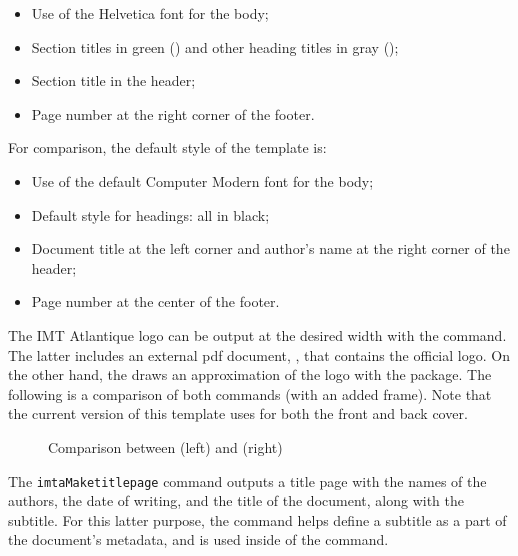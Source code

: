 \documentclass{report}
\begin{document}
\begin{itemize}
    \item Use of the Helvetica font for the body;
    \item Section titles in green () and other heading titles in gray ();
    \item Section title in the header;
    \item Page number at the right corner of the footer.
\end{itemize}

\vspace{1em}
For comparison, the default style of the template is:

\begin{itemize}
    \item Use of the default Computer Modern font for the body;
    \item Default style for headings: all in black;
    \item Document title at the left corner and author's name at the right corner of the header;
    \item Page number at the center of the footer.
\end{itemize}


The IMT Atlantique logo can be output at the desired width with the  command.
The latter includes an external pdf document, , that contains the official logo.
On the other hand, the  draws an approximation of the logo with the  package.
The following is a comparison of both commands (with an added frame). Note that the current version of this template uses  for both the front and back cover.

\begin{figure}[H]
    \centering
    \fbox{\imtaLogo{5cm}}
    \fbox{\imtaLogo{5cm}}
    \caption{Comparison between  (left) and  (right)}
    \label{fig:imtaLogo}
\end{figure}


The \texttt{imtaMaketitlepage} command outputs a title page with the names of the authors, the date of writing, and the title of the document, along with the subtitle.
For this latter purpose, the  command helps define a subtitle as a part of the document's metadata, and %
is used inside of the  command.
\end{document}
